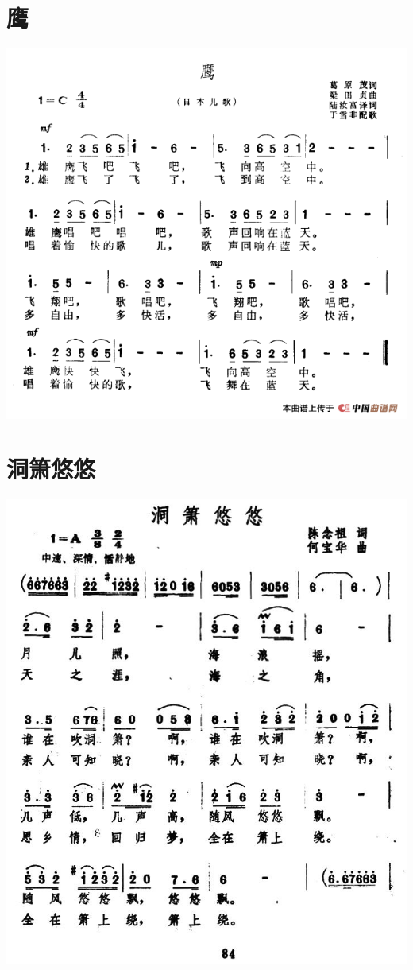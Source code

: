 \documentclass[cn,pad,chinese,chinesefont=nofont]{elegantbook}
\begin{document}
\section{鹰}
    \includegraphics[width=\textwidth]{dongxiao/日本-鹰.png}

\section{洞箫悠悠}
    \includegraphics[width=\textwidth]{dongxiao/洞箫悠悠.jpg}
\end{document}
